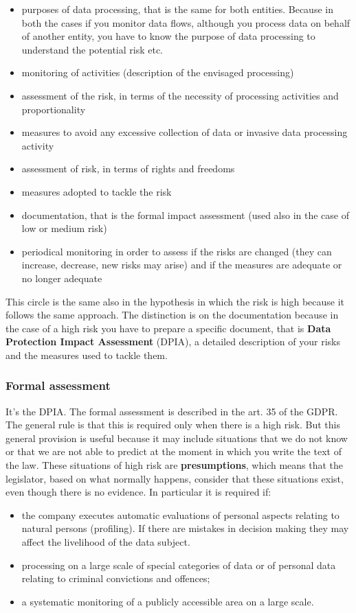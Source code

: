 \begin{itemize}
    \item purposes of data processing, that is the same for both entities. Because in both the cases if you monitor data flows, although you process data on behalf of another entity, you have to know the purpose of data processing to understand the potential risk etc.
    \item monitoring of activities (description of the envisaged processing)
    \item assessment of the risk, in terms of the necessity of processing activities and proportionality
    \item measures to avoid any excessive collection of data or invasive data processing activity
    \item assessment of risk, in terms of rights and freedoms
    \item measures adopted to tackle the risk
    \item documentation, that is the formal impact assessment (used also in the case of low or medium risk)
    \item periodical monitoring in order to assess if the risks are changed (they can increase, decrease, new risks may arise) and if the measures are adequate or no longer adequate
\end{itemize}
This circle is the same also in the hypothesis in which the risk is high because it follows the same approach. The distinction is on the documentation because in the case of a high risk you have to prepare a specific document, that is\textbf{ Data Protection Impact Assessment} (DPIA), a detailed description of your risks and the measures used to tackle them.
\subsubsection{Formal assessment}
\label{sect:formal_assess}
It's the DPIA. The formal assessment is described in the art. 35 of the GDPR. The general rule is that this is required only when there is a high risk. But this general provision is useful because it may include situations that we do not know or that we are not able to predict at the moment in which you write the text of the law. These situations of high risk are \textbf{presumptions}, which means that the legislator, based on what normally happens, consider that these situations exist, even though there is no evidence.
In particular it is required if:
\begin{itemize}
    \item the company executes automatic evaluations of personal aspects relating to natural persons (profiling). If there are mistakes in decision making they may affect the livelihood of the data subject.
    \item processing on a large scale of special categories of data or of personal data relating to criminal convictions and offences;
    \item a systematic monitoring of a publicly accessible area on a large scale.
\end{itemize}

